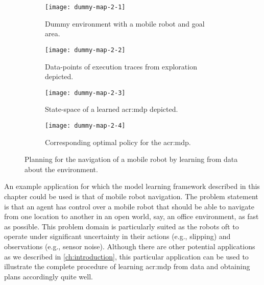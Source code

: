\begin{figure}[t]
\centering

\captionsetup{font=small}
\captionsetup[subfigure]{font=footnotesize}
\captionsetup[subfigure]{justification=centering}
\begin{subfigure}{.5\textwidth}
	\centering
	\texttt{[image: dummy-map-2-1]}
	\caption{Dummy environment with a mobile robot and goal area.}
	\label{fig:dummy-map-1}
\end{subfigure}\hfill
\begin{subfigure}{.5\textwidth}
	\centering
	\texttt{[image: dummy-map-2-2]}
	\caption{Data-points of execution traces from exploration depicted.}
	\label{fig:dummy-map-2}
\end{subfigure}

\bigskip

\begin{subfigure}{.5\textwidth}
	\centering
	\texttt{[image: dummy-map-2-3]}
	\caption{State-space of a learned \acrshort{acr:mdp} depicted.}
	\label{fig:dummy-map-3}
\end{subfigure}\hfill
\begin{subfigure}{.5\textwidth}
	\centering
	\texttt{[image: dummy-map-2-4]}
	\caption{Corresponding optimal policy for the \acrshort{acr:mdp}.}
	\label{fig:dummy-map-4}
\end{subfigure}
	\caption{Planning for the navigation of a mobile robot by learning  from data about the environment.}
\end{figure}


An example application for which the model learning framework described in this chapter could be used is that of mobile robot navigation.
The problem statement is that an agent has control over a mobile robot that should be able to navigate from one location to another in an open world, say, an office environment, as fast as possible.
This problem domain is particularly suited as the robots oft to operate under significant uncertainty in their actions (e.g., slipping) and observations (e.g., sensor noise).
Although there are other potential applications as we described in \autoref{ch:introduction}, this particular application can be used to illustrate the complete procedure of learning \acrshort{acr:mdp} from data and obtaining plans accordingly quite well.

